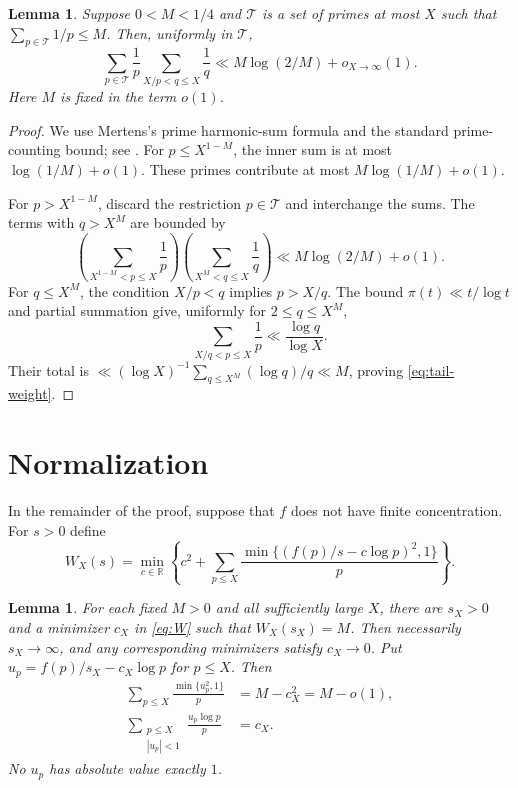 \documentclass[11pt]{article}
\numberwithin{equation}{section}
\newtheorem{lemma}[theorem]{Lemma}
\newcommand{\R}{\mathbb R}
\begin{document}
\begin{lemma}\label{lem:tail-weight}
Suppose $0<M<1/4$ and $\mathcal T$ is a set of primes at most $X$
such that $\sum_{p\in\mathcal T}1/p\le M$. Then, uniformly in
$\mathcal T$,
\begin{equation}\label{eq:tail-weight}
 \sum_{p\in\mathcal T}\frac1p
       \sum_{X/p<q\le X}\frac1q
 \ll M\log(2/M)+o_{X\to\infty}(1).
\end{equation}
Here $M$ is fixed in the term $o(1)$.
\end{lemma}

\begin{proof}
We use Mertens's prime harmonic-sum formula and the standard
prime-counting bound; see \cite{Tenenbaum}. For $p\le X^{1-M}$, the inner sum is at most
$\log(1/M)+o(1)$. These primes
contribute at most $M\log(1/M)+o(1)$.

For $p>X^{1-M}$, discard the restriction $p\in\mathcal T$ and
interchange the sums. The terms with $q>X^M$ are bounded by
\[
 \left(\sum_{X^{1-M}<p\le X}\frac1p\right)
 \left(\sum_{X^M<q\le X}\frac1q\right)
 \ll M\log(2/M)+o(1).
\]
For $q\le X^M$, the condition $X/p<q$ implies $p>X/q$.
The bound $\pi(t)\ll t/\log t$ and partial summation give,
uniformly for $2\le q\le X^M$,
\[
 \sum_{X/q<p\le X}\frac1p\ll\frac{\log q}{\log X}.
\]
Their total is $\ll(\log X)^{-1}\sum_{q\le X^M}(\log q)/q\ll M$,
proving \eqref{eq:tail-weight}.
\end{proof}

\section{Normalization}

In the remainder of the proof, suppose that $f$ does not have finite
concentration. For $s>0$ define
\begin{equation}\label{eq:W}
 W_X(s)=\min_{c\in\R}
 \left\{c^2+\sum_{p\le X}
       \frac{\min\{(f(p)/s-c\log p)^2,1\}}p\right\}.
\end{equation}

\begin{lemma}\label{lem:normalization}
For each fixed $M>0$ and all sufficiently large $X$, there are
$s_X>0$ and a minimizer $c_X$ in \eqref{eq:W} such that
$W_X(s_X)=M$. Then necessarily $s_X\to\infty$, and any corresponding
minimizers satisfy $c_X\to0$. Put $u_p=f(p)/s_X-c_X\log p$ for
$p\le X$. Then
\begin{align}
 \sum_{p\le X}\frac{\min\{u_p^2,1\}}p
 &=M-c_X^2=M-o(1),\label{eq:mass}\\
 \sum_{\substack{p\le X\\|u_p|<1}}
       \frac{u_p\log p}{p}&=c_X.\label{eq:stationarity}
\end{align}
No $u_p$ has absolute value exactly $1$.
\end{lemma}
\end{document}
